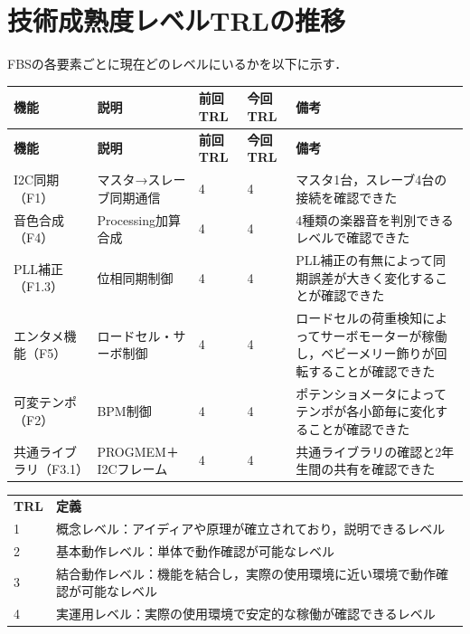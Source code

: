 \documentclass[a4paper,12pt]{ltjsarticle}
\begin{document}
\section{技術成熟度レベルTRLの推移}
FBSの各要素ごとに現在どのレベルにいるかを以下に示す．

\begin{longtable}{L{2.5cm}L{4cm}C{2cm}C{2cm}L{3.5cm}}
  \toprule
  \textbf{機能} & \textbf{説明} & \textbf{前回TRL} & \textbf{今回TRL} & \textbf{備考} \\
  \midrule
  \endfirsthead
  \toprule
  \textbf{機能} & \textbf{説明} & \textbf{前回TRL} & \textbf{今回TRL} & \textbf{備考} \\
  \midrule
  \endhead
  \midrule
  \endfoot
  \bottomrule
  \endlastfoot
  I2C同期（F1） & マスタ→スレーブ同期通信 & 4 & 4 & マスタ1台，スレーブ4台の接続を確認できた \\
  音色合成（F4） & Processing加算合成 & 4 & 4 & 4種類の楽器音を判別できるレベルで確認できた \\
  PLL補正（F1.3） & 位相同期制御 & 4 & 4 & PLL補正の有無によって同期誤差が大きく変化することが確認できた \\
  エンタメ機能（F5） & ロードセル・サーボ制御 & 4 & 4 & ロードセルの荷重検知によってサーボモーターが稼働し，ベビーメリー飾りが回転することが確認できた \\
  可変テンポ（F2） & BPM制御 & 4 & 4 & ポテンショメータによってテンポが各小節毎に変化することが確認できた \\
  共通ライブラリ（F3.1） & PROGMEM＋I2Cフレーム & 4 & 4 & 共通ライブラリの確認と2年生間の共有を確認できた \\
\end{longtable}

\noindent
{\small
\begin{tabular}{ll}
  \textbf{TRL} & \textbf{定義} \\
  1 & 概念レベル：アイディアや原理が確立されており，説明できるレベル \\
  2 & 基本動作レベル：単体で動作確認が可能なレベル \\
  3 & 結合動作レベル：機能を結合し，実際の使用環境に近い環境で動作確認が可能なレベル \\
  4 & 実運用レベル：実際の使用環境で安定的な稼働が確認できるレベル \\
\end{tabular}
}
\end{document}
